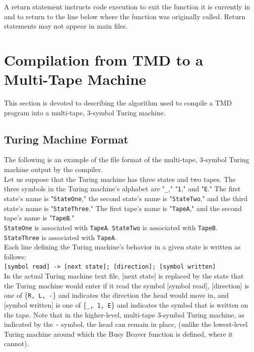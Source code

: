 \documentclass[11pt]{report}
\begin{document}
A return statement instructs code execution to exit the function it is currently in and to return to the line below where the function was originally called. Return statements may not appear in main files.

\section{Compilation from TMD to a Multi-Tape Machine \label{sec:turdtotm}}

This section is devoted to describing the algorithm used to compile a TMD program into a multi-tape, 3-symbol Turing machine.

\subsection{Turing Machine Format}

The following is an example of the file format of the multi-tape, 3-symbol Turing machine output by the compiler. \\

Let us suppose that the Turing machine has three states and two tapes. The three symbols in the Turing machine's alphabet are "\texttt{\_}," "\texttt{1}," and "\texttt{E}." The first state's name is "\texttt{StateOne}," the second state's name is "\texttt{StateTwo}," and the third state's name is "\texttt{StateThree}." The first tape's name is "\texttt{TapeA}," and the second tape's name is "\texttt{TapeB}." \\

\texttt{StateOne} is associated with \texttt{TapeA}. \texttt{StateTwo} is associated with \texttt{TapeB}. \texttt{StateThree} is associated with \texttt{TapeA}. \\

Each line defining the Turing machine's behavior in a given state is written as follows: \\

\texttt{[symbol read] -> [next state]; [direction]; [symbol written]} \\

In the actual Turing machine text file, [next state] is replaced by the state that the Turing machine would enter if it read the symbol [symbol read], [direction] is one of \{\texttt{R, L, -}\} and indicates the direction the head would move in, and [symbol written] is one of \{\texttt{\_, 1, E}\} and indicates the symbol that is written on the tape. Note that in the higher-level, multi-tape 3-symbol Turing machine, as indicated by the \texttt{-} symbol, the head can remain in place, (unlike the lowest-level Turing machine around which the Busy Beaver function is defined, where it cannot). \\
\end{document}
